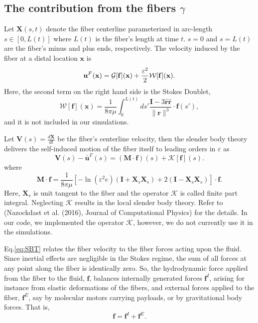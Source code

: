\documentclass{article}
\newcommand{\XX}{\mathbf{X}}
\newcommand{\xx}{\mathbf{x}}
\newcommand{\rr}{\mathbf{r}}
\newcommand{\rrhat}{\hat{\mathbf{r}}}
\newcommand{\ubarF}{\bar{\mathbf{u}}^F}
\newcommand{\uF}{{\mathbf{u}}^F}
\newcommand{\ff}{\mathbf{f}}
\newcommand{\MM}{\mathbf{M}}
\newcommand{\calG}{\mathcal{G}}
\newcommand{\VV}{\mathbf{V}}
\newcommand{\II}{\mathbf{I}}
\begin{document}
\subsection{The contribution from the fibers $\gamma$}
Let $\XX(s,t)$ denote the fiber centerline parameterized in arc-length $s \in [0, L(t)]$ where $L(t)$ is the fiber's length at time $t$. $s = 0$ and $s = L(t)$ are the fiber's minus and plus ends, respectively. The velocity induced by the fiber at a distal location $\xx$ is
\begin{equation}{\label{eq:Gotz}}
\uF (\xx) = \calG[\ff](\xx) + \frac{\varepsilon^2}{2}\mathcal{W}[\ff](\xx).
\end{equation}
Here, the second term on the right hand side is the Stokes Doublet,
\begin{equation*}
    \mathcal{W}[\ff](\xx) = \frac{1}{8\pi\mu}\int_0^{L(t)} ds' \frac{\II-3\rrhat\rrhat}{\|\rr\|^3}\cdot\ff(s'),
\end{equation*}
and it is not included in our simulations.

Let $\VV(s) = \frac{d\XX}{dt}$ be the fiber's centerline velocity, then the slender body theory delivers the self-induced motion of the fiber itself to leading orders in $\varepsilon$ as
\begin{equation}\label{eq:SBT}
    \VV(s) - \ubarF(s) = (\MM\cdot\ff)(s) + \mathcal{K}[\ff](s).
\end{equation}
where
\begin{equation}
    \MM\cdot\ff = \frac{1}{8\pi\mu}[-\ln(\varepsilon^2e)(\II + \XX_s \XX_s) + 2(\II -\XX_s \XX_s)]\cdot \ff.
\end{equation}
Here, $\XX_s$ is unit tangent to the fiber and the operator $\mathcal{K}$ is called finite part integral. Neglecting $\mathcal{K}$ results in the local slender body theory. Refer to (Nazockdast et al. (2016), Journal of Computational Physics) for the details. In our code, we implemented the operator $\mathcal{K}$, however, we do not currently use it in the simulations.

Eq.\eqref{eq:SBT} relates the fiber velocity to the fiber forces acting upon the fluid. Since inertial effects are negligible in the Stokes regime, the sum of all forces at any point along the fiber is identically zero. So, the hydrodynamic force applied from the fiber to the fluid, $\ff$, balances internally generated forces $\ff^I$, arising for instance from elastic deformations of the fibers, and external forces applied to the fiber, $\ff^E$, say by molecular motors carrying payloads, or by gravitational body forces. That is,
\begin{equation}
    \ff = \ff^I + \ff^E.
\end{equation}
\end{document}
